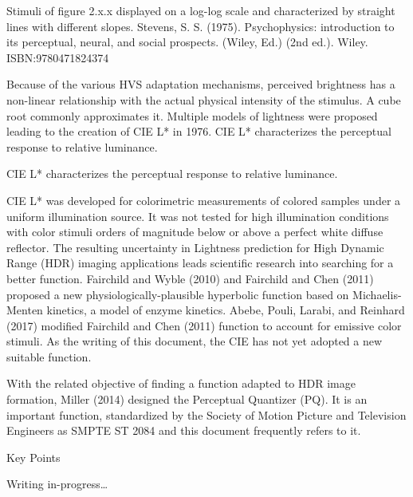 Stimuli of figure 2.x.x displayed on a log-log scale and characterized by straight lines with different slopes. Stevens, S. S. (1975). Psychophysics: introduction to its perceptual, neural, and social prospects. (Wiley, Ed.) (2nd ed.). Wiley. ISBN:9780471824374

Because of the various HVS adaptation mechanisms, perceived brightness has a non-linear relationship with the actual physical intensity of the stimulus. A cube root commonly approximates it. Multiple models of lightness were proposed leading to the creation of CIE L* in 1976. CIE L* characterizes the perceptual response to relative luminance.


CIE L* characterizes the perceptual response to relative luminance.

CIE L* was developed for colorimetric measurements of colored samples under a uniform illumination source. It was not tested for high illumination conditions with color stimuli orders of magnitude below or above a perfect white diffuse reflector. The resulting uncertainty in Lightness prediction for High Dynamic Range (HDR) imaging applications leads scientific research into searching for a better function. Fairchild and Wyble (2010) and Fairchild and Chen (2011) proposed a new physiologically-plausible hyperbolic function based on Michaelis-Menten kinetics, a model of enzyme kinetics. Abebe, Pouli, Larabi, and Reinhard (2017) modified Fairchild and Chen (2011) function to account for emissive color stimuli. As the writing of this document, the CIE has not yet adopted a new suitable function.

With the related objective of finding a function adapted to HDR image formation, Miller (2014) designed the Perceptual Quantizer (PQ). It is an important function, standardized by the Society of Motion Picture and Television Engineers as SMPTE ST 2084 and this document frequently refers to it.

Key Points

Writing in-progress…



